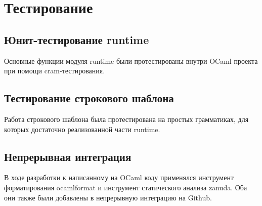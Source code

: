
\section{Тестирование}

\subsection{Юнит-тестирование runtime}

Основные функции модуля runtime были протестированы внутри OCaml-проекта при помощи cram-тестирования.

\subsection{Тестирование строкового шаблона}

Работа строкового шаблона была протестирована на простых грамматиках, для которых достаточно реализованной части runtime.

\subsection{Непрерывная интеграция}

В ходе разработки к написанному на OCaml коду применялся инструмент форматирования ocamlformat и инструмент статического анализа zanuda. 
Оба они также были добавлены в непрерывную интеграцию на Github.
